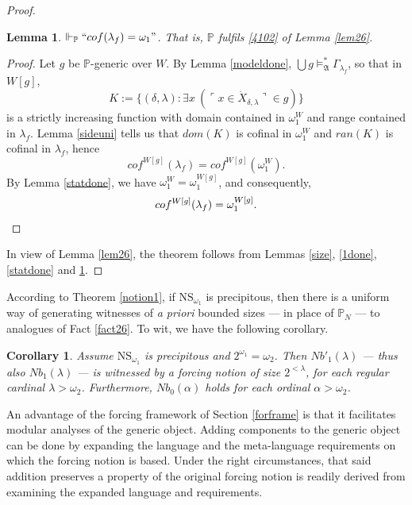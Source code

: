 \documentclass[12pt, twoside]{memoir}
\numberwithin{equation}{section}
\newtheorem{lem}[thm]{Lemma}
\newtheorem{cor}[thm]{Corollary}
\theoremstyle{definition}
\theoremstyle{remark}
\theoremstyle{definition}
\theoremstyle{definition}
\theoremstyle{definition}
\theoremstyle{remark}
\begin{document}
\begin{proof}
\begin{lem}\label{2done}
$\Vdash_{\mathbb{P}} ``cof(\lambda_f) = \omega_1"$. That is, $\mathbb{P}$ fulfils \ref{4102} of Lemma \ref{lem26}.
\end{lem}

\begin{proof}
Let $g$ be $\mathbb{P}$-generic over $W$. By Lemma \ref{modeldone}, $\bigcup g \models^*_{\mathfrak{A}} \Gamma_{\lambda_f}$, so that in $W[g]$, $$K := \{(\delta, \lambda) : \exists x \ (\ulcorner x \in \dot{X}_{\delta, \lambda} \urcorner \in g)\}$$ is a strictly increasing function with domain contained in $\omega_1^W$ and range contained in $\lambda_f$. Lemma \ref{sideuni} tells us that $dom(K)$ is cofinal in $\omega_1^W$ and $ran(K)$ is cofinal in $\lambda_f$, hence $$cof^{W[g]}(\lambda_f) = cof^{W[g]}(\omega_1^W).$$ By Lemma \ref{statdone}, we have $\omega_1^W = \omega_1^{W[g]}$, and consequently, 
\begin{equation*}
    cof^{W[g]}(\lambda_f) = \omega_1^{W[g]}.
    \qedhere
\end{equation*}
\end{proof}

In view of Lemma \ref{lem26}, the theorem follows from Lemmas \ref{size}, \ref{1done}, \ref{statdone} and \ref{2done}.
\end{proof}

According to Theorem \ref{notion1}, if $\mathrm{NS}_{\omega_1}$ is precipitous, then there is a uniform way of generating witnesses of \textit{a priori} bounded sizes --- in place of $\mathbb{P}_N$ --- to analogues of Fact \ref{fact26}. To wit, we have the following corollary.

\begin{cor}\label{nambacoro}
Assume $\mathrm{NS}_{\omega_1}$ is precipitous and $2^{\omega_1} = \omega_2$. Then $Nb'_1(\lambda)$ --- thus also $Nb_1(\lambda)$ --- is witnessed by a forcing notion of size $2^{< \lambda}$, for each regular cardinal $\lambda > \omega_2$. Furthermore, $Nb_0(\alpha)$ holds for each ordinal $\alpha > \omega_2$.
\end{cor}

An advantage of the forcing framework of Section \ref{forframe} is that it facilitates modular analyses of the generic object. Adding components to the generic object can be done by expanding the language and the meta-language requirements on which the forcing notion is based. Under the right circumstances, that said addition preserves a property of the original forcing notion is readily derived from examining the expanded language and requirements.
\end{document}
